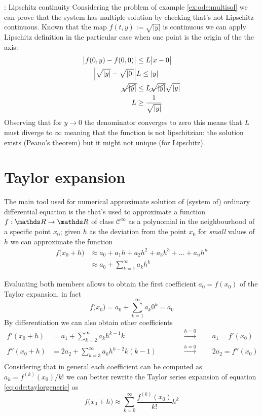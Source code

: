	\begin{example}{: Lipschitz continuity}
		Considering the problem of example \ref{ex:ode:multisol} we can prove that the system has multiple solution by checking that's not Lipschitz continuous. Known that the map $f(t,y):= \sqrt{|y|}$ is continuous we can apply Lipschitz definition in the particular case when one point is the origin of the the axis:
		\begin{align*}
			\big| f(0,y) - f(0,0)\big| & \leq L\big|x-0\big| \\
			\left| \sqrt{|y|} - \sqrt{|0|} \right| & L  \leq |y| \\
			\cancel{\sqrt{|y|}} & \leq L \cancel{\sqrt{|y|}} \sqrt{|y|} \\
			L & \geq \frac 1{\sqrt{|y|}}
		\end{align*}
		Observing that for $y\rightarrow 0$ the denominator converges to zero this means that $L$ must diverge to $\infty$ meaning that the function is not lipschitzian: the solution exists (Peano's theorem) but it might not unique (for Lipschitz).
	\end{example}

\section{Taylor expansion}
	The main tool used for numerical approximate solution of (system of) ordinary differential equation is the  that's used to approximate a function $f:\R\rightarrow \R$ of class $\mathcal C^\infty$ as a polynomial in the neighbourhood of a specific point $x_0$; given $h$ as the deviation from the point $x_0$ for \textit{small} values of $h$ we can approximate the function
	\begin{equation} \label{eq:ode:taylorgeneric}
	\begin{split}
		f\big(x_0 + h\big) & \approx a_0 + a_1 h + a_2 h^2 + a_3 h^3 + \dots + a_n h^n \\
		& \approx a_0 + \sum_{k=1}^\infty a_k h^k
	\end{split} 
	\end{equation}
	
	Evaluating both members allows to obtain the first coefficient $a_0 =f(x_0)$ of the Taylor expansion, in fact
	\[ f\big(x_0\big) = a_0 + \sum_{k=1}^\infty a_k 0^k = a_0  \]
	By differentiation we can also obtain other coefficients
	\begin{align*}
		f'(x_0+h) & = a_1 + \sum_{k=2}^\infty a_k h^{k-1}k \qquad && \xrightarrow{h = 0} \qquad a_1 = f'(x_0) \\
		f''(x_0+h) & = 2a_2 + \sum_{k=3}^\infty a_k h^{k-2}k(k-1) \qquad && \xrightarrow{h = 0} \qquad 2a_2 = f''(x_0) \\
	\end{align*}
	Considering that in general each coefficient can be computed as $a_k = f^{(k)}(x_0) / k!$ we can better rewrite the Taylor series expansion of equation \ref{eq:ode:taylorgeneric} as
	\begin{equation} \label{eq:ode:taylor}
		f\big(x_0 + h\big) \approx \sum_{k=0}^{\infty} \frac{f^{(k)}(x_0)}{k!} h^k
	\end{equation}
	
